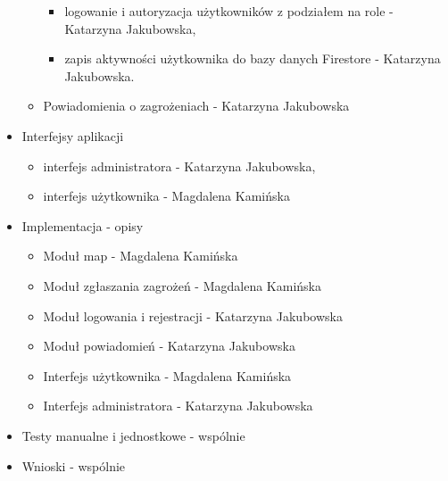 \begin{itemize}
\begin{itemize}[label=$\circ$]
\begin{itemize}
                \item logowanie i autoryzacja użytkowników z podziałem na role - Katarzyna Jakubowska,
                \item zapis aktywności użytkownika do bazy danych Firestore - Katarzyna Jakubowska.
            \end{itemize}
            \item Powiadomienia o zagrożeniach - Katarzyna Jakubowska
        \end{itemize}
        \item Interfejsy aplikacji
        \begin{itemize}[label=$\circ$]
            \item interfejs administratora - Katarzyna Jakubowska,
            \item interfejs użytkownika - Magdalena Kamińska
        \end{itemize}
        \item Implementacja - opisy
        \begin{itemize}
            \item Moduł map - Magdalena Kamińska
            \item Moduł zgłaszania zagrożeń - Magdalena Kamińska
            \item Moduł logowania i rejestracji - Katarzyna Jakubowska
            \item Moduł powiadomień - Katarzyna Jakubowska
            \item Interfejs użytkownika - Magdalena Kamińska
            \item Interfejs administratora - Katarzyna Jakubowska
        \end{itemize}
        \item Testy manualne i jednostkowe - wspólnie
        \item Wnioski - wspólnie
        \end{itemize}
   

    \newpage
